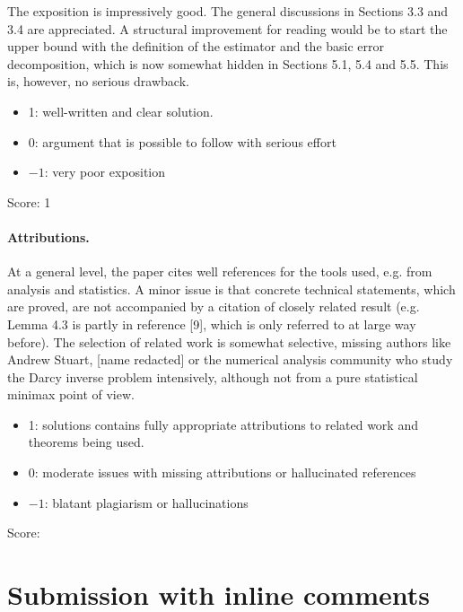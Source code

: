 \documentclass[11pt]{article}
\numberwithin{equation}{section}
\begin{document}
The exposition is impressively good. The general discussions in Sections 3.3 and 3.4 are appreciated. A structural improvement for reading would be to start the upper bound with the definition of the estimator and the basic error decomposition, which is now somewhat hidden in Sections 5.1, 5.4 and 5.5. This is, however, no serious drawback.

\begin{itemize}
	\item  1: well-written and clear solution.
	\item  0: argument that is possible to follow with serious effort
	\item  $-1$: very poor exposition
\end{itemize}

\noindent Score: 1

\paragraph{Attributions.}

At a general level, the paper cites well references for the tools used, e.g. from analysis and statistics. A minor issue is that concrete technical statements, which are proved, are not accompanied by a citation of closely related result (e.g. Lemma 4.3 is partly in reference [9], which is only referred to at large way before). The selection of related work is somewhat selective, missing authors like Andrew Stuart, [name redacted] or the numerical analysis community who study the Darcy inverse problem intensively, although not from a pure statistical minimax point of view.


\begin{itemize}
	\item  1: solutions contains fully appropriate attributions
		to related work and theorems being used.
	\item  0: moderate issues with missing attributions or hallucinated references
	\item  $-1$: blatant plagiarism or hallucinations
\end{itemize}

\noindent Score: 

\newpage
\section{Submission with inline comments}
\end{document}
